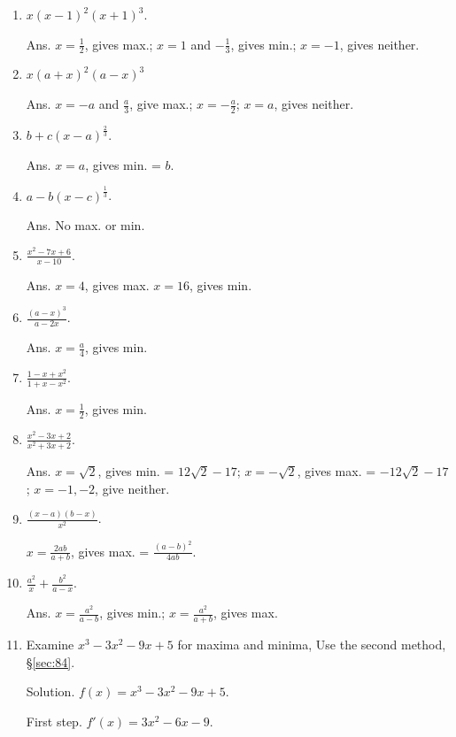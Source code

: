 \begin{enumerate}
\item
$x(x - 1)^2(x + 1)^3$.

Ans. $x = \frac{1}{2}$, gives max.;
$x = 1$ and $-\frac{1}{3}$, gives min.;
$x = -1$, gives neither.

\item
$x(a + x)^2(a - x)^3$ 	

Ans. $x = -a$ and $\frac{a}{3}$, give max.;
  	$x = -\frac{a}{2}$;
  	$x = a$, gives neither.

\item
$b + c(x - a)^{\frac{2}{3}}$.

Ans. $x = a$, gives min. = $b$.

\item
$a - b(x - c)^{\frac{1}{3}}$. 

Ans. No max. or min.

\item
$\frac{x^2 - 7x + 6}{x - 10}$.

Ans. $x = 4$, gives max.
  $x = 16$, gives min.

\item
$\frac{(a - x)^3}{a - 2x}$.

Ans. $x = \frac{a}{4}$, gives min.

\item
$\frac{1 - x + x^2}{1 + x - x^2}$.

Ans. $	x = \frac{1}{2}$, gives min.

\item
$\frac{x^2 - 3x + 2}{x^2 + 3x +2}$.

Ans. $x = \sqrt{2}$, gives min. = $12\sqrt{2} - 17$;
$x = -\sqrt{2}$, gives max. = $-12\sqrt{2} - 17$;
$x = - 1, - 2$, give neither.

\item
$\frac{(x - a)(b - x)}{x^2}$.

$x = \frac{2ab}{a + b}$, gives max. = $\frac{(a - b)^2}{4ab}$.

\item
$\frac{a^2}{x} + \frac{b^2}{a - x}$.

Ans. $x = \frac{a^2}{a - b}$, gives min.;
$x = \frac{a^2}{a + b}$, gives max.

\item
Examine $x^3 - 3x^2 - 9x + 5$ for maxima and minima, 
Use the second method, \S \ref{sec:84}. %

Solution. $f(x) 	= x^3 - 3x^2 - 9x + 5$.

First step. 	$f'(x) 	= 3x^2 - 6x - 9$.


\end{enumerate}
